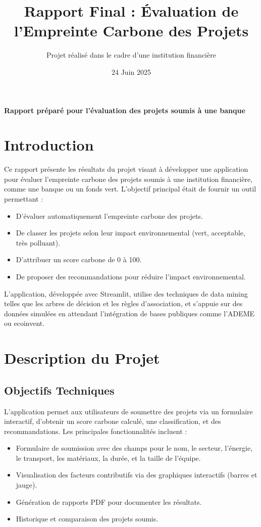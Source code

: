 \documentclass[a4paper,12pt]{article}
\title{Rapport Final : Évaluation de l'Empreinte Carbone des Projets}
\author{Projet réalisé dans le cadre d'une institution financière}
\date{24 Juin 2025}
\begin{document}
\maketitle
\begin{center}
    \vspace{1cm}
    \textbf{Rapport préparé pour l'évaluation des projets soumis à une banque}
\end{center}

\tableofcontents
\newpage

\section{Introduction}
Ce rapport présente les résultats du projet visant à développer une application pour évaluer l'empreinte carbone des projets soumis à une institution financière, comme une banque ou un fonds vert. L'objectif principal était de fournir un outil permettant :
\begin{itemize}
    \item D'évaluer automatiquement l'empreinte carbone des projets.
    \item De classer les projets selon leur impact environnemental (vert, acceptable, très polluant).
    \item D'attribuer un score carbone de 0 à 100.
    \item De proposer des recommandations pour réduire l'impact environnemental.
\end{itemize}
L'application, développée avec Streamlit, utilise des techniques de data mining telles que les arbres de décision et les règles d'association, et s'appuie sur des données simulées en attendant l'intégration de bases publiques comme l'ADEME ou ecoinvent.

\section{Description du Projet}
\subsection{Objectifs Techniques}
L'application permet aux utilisateurs de soumettre des projets via un formulaire interactif, d'obtenir un score carbone calculé, une classification, et des recommandations. Les principales fonctionnalités incluent :
\begin{itemize}
    \item Formulaire de soumission avec des champs pour le nom, le secteur, l'énergie, le transport, les matériaux, la durée, et la taille de l'équipe.
    \item Visualisation des facteurs contributifs via des graphiques interactifs (barres et jauge).
    \item Génération de rapports PDF pour documenter les résultats.
    \item Historique et comparaison des projets soumis.
\end{itemize}
\end{document}
